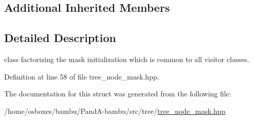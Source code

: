 \subsection*{Additional Inherited Members}


\subsection{Detailed Description}
class factorizing the mask initialization which is common to all visitor classes. 

Definition at line 58 of file tree\+\_\+node\+\_\+mask.\+hpp.



The documentation for this struct was generated from the following file\+:\begin{DoxyCompactItemize}
\item 
/home/osboxes/bambu/\+Pand\+A-\/bambu/src/tree/\hyperlink{tree__node__mask_8hpp}{tree\+\_\+node\+\_\+mask.\+hpp}\end{DoxyCompactItemize}
